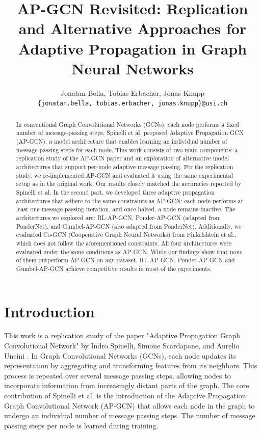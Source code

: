 \documentclass{gdl}
\begin{document}
\title{AP-GCN Revisited: Replication and Alternative Approaches for Adaptive Propagation in Graph Neural Networks}

\author{%
Jonatan Bella, Tobias Erbacher, Jonas Knupp\\
\texttt{\{jonatan.bella, tobias.erbacher, jonas.knupp\}@usi.ch}
\vspace{-1.0cm}
}

\begin{abstract}
In conventional Graph Convolutional Networks (GCNs), each node performs a fixed number of message-passing steps. Spinelli et al. proposed Adaptive Propagation GCN (AP-GCN), a model architecture that enables learning an individual number of message-passing steps for each node. This work consists of two main components: a replication study of the AP-GCN paper and an exploration of alternative model architectures that support per-node adaptive message passing.
For the replication study, we re-implemented AP-GCN and evaluated it using the same experimental setup as in the original work. Our results closely matched the accuracies reported by Spinelli et al.
In the second part, we developed three adaptive propagation architectures that adhere to the same constraints as AP-GCN: each node performs at least one message-passing iteration, and once halted, a node remains inactive. The architectures we explored are: RL-AP-GCN, Ponder-AP-GCN (adapted from PonderNet), and Gumbel-AP-GCN (also adapted from PonderNet). Additionally, we evaluated Co-GCN (Cooperative Graph Neural Networks) from Finkelshtein et al., which does not follow the aforementioned constraints.
All four architectures were evaluated under the same conditions as AP-GCN. While our findings show that none of them outperform AP-GCN on any dataset, RL-AP-GCN, Ponder-AP-GCN and Gumbel-AP-GCN achieve competitive results in most of the experiments. 
\vspace{-1.5cm}
\end{abstract}


\maketitle

\section{Introduction}
This work is a replication study of the paper "Adaptive Propagation Graph Convolutional Network" by Indro Spinelli, Simone Scardapane, and Aurelio Uncini \cite{spinelli2021}. In Graph Convolutional Networks (GCNs), each node updates its representation by aggregating and transforming features from its neighbors. This process is repeated over several message passing steps, allowing nodes to incorporate information from increasingly distant parts of the graph. The core contribution of Spinelli et al. is the introduction of the Adaptive Propagation Graph Convolutional Network (AP-GCN) that allows each node in the graph to undergo an individual number of message passing steps. The number of message passing steps per node is learned during training.
\end{document}
